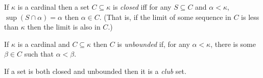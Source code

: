 \documentclass[12pt]{article}
\begin{document}
If $\kappa$ is a cardinal then a set $C\subseteq\kappa$ is \emph{closed} iff for any $S\subseteq C$ and $\alpha<\kappa$, $\sup(S\cap \alpha)=\alpha$ then $\alpha\in C$.  (That is, if the limit of some sequence in $C$ is less than $\kappa$ then the limit is also in $C$.)

If $\kappa$ is a cardinal and $C\subseteq\kappa$ then $C$ is \emph{unbounded} if, for any $\alpha<\kappa$, there is some $\beta\in C$ such that $\alpha<\beta$.

If a set is both closed and unbounded then it is a \emph{club} set.
\end{document}
